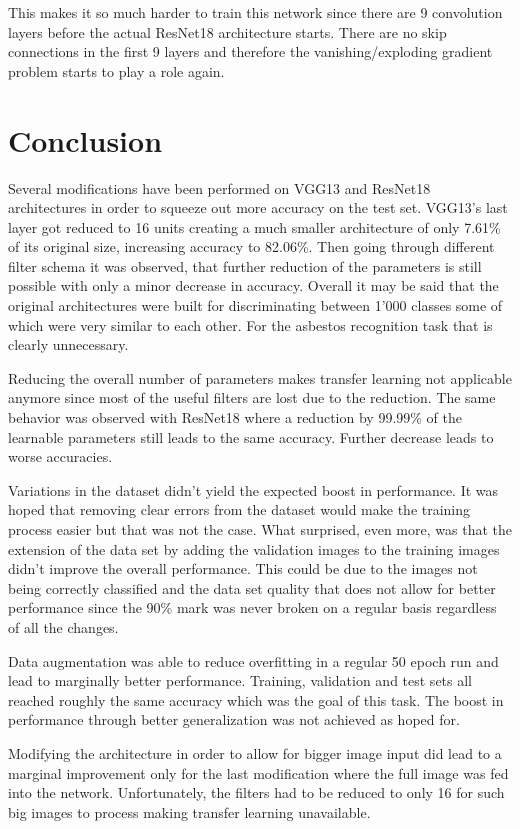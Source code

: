 This makes it so much harder to train this network since there are 9 convolution layers before the actual ResNet18 architecture starts. There are no skip connections in the first 9 layers and therefore the vanishing/exploding gradient problem starts to play a role again.


\section{Conclusion}

Several modifications have been performed on VGG13 and ResNet18 architectures in order to squeeze out more accuracy on the test set. VGG13's last layer got reduced to 16 units creating a much smaller architecture of only 7.61\% of its original size, increasing accuracy to 82.06\%. Then going through different filter schema it was observed, that further reduction of the parameters is still possible with only a minor decrease in accuracy. Overall it may be said that the original architectures were built for discriminating between 1'000 classes some of which were very similar to each other. For the asbestos recognition task that is clearly unnecessary.

Reducing the overall number of parameters makes transfer learning not applicable anymore since most of the useful filters are lost due to the reduction. The same behavior was observed with ResNet18 where a reduction by 99.99\% of the learnable parameters still leads to the same accuracy. Further decrease leads to worse accuracies.

Variations in the dataset didn't yield the expected boost in performance. It was hoped that removing clear errors from the dataset would make the training process easier but that was not the case. What surprised, even more, was that the extension of the data set by adding the validation images to the training images didn't improve the overall performance. This could be due to the images not being correctly classified and the data set quality that does not allow for better performance since the 90\% mark was never broken on a regular basis regardless of all the changes.

Data augmentation was able to reduce overfitting in a regular 50 epoch run and lead to marginally better performance. Training, validation and test sets all reached roughly the same accuracy which was the goal of this task. The boost in performance through better generalization was not achieved as hoped for.

Modifying the architecture in order to allow for bigger image input did lead to a marginal improvement only for the last modification where the full image was fed into the network. Unfortunately, the filters had to be reduced to only 16 for such big images to process making transfer learning unavailable.

